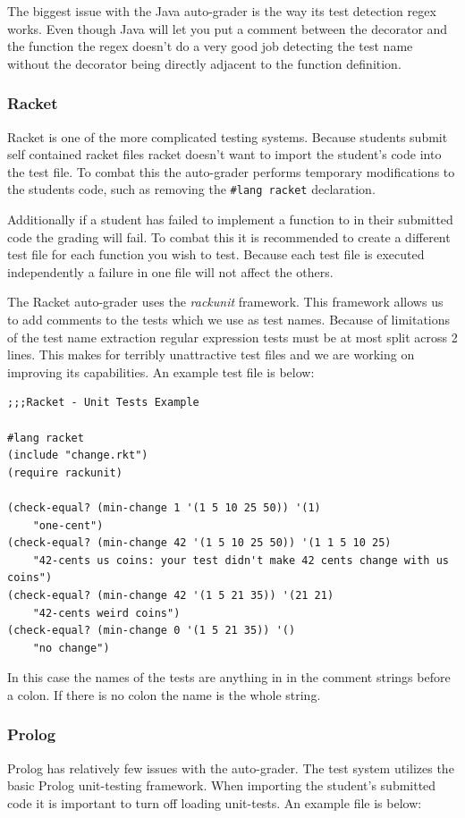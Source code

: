 \documentclass[11pt]{report}
\begin{document}
The biggest issue with the Java auto-grader is the way its test detection regex works. Even though
Java will let you put a comment between the decorator and the function the regex doesn't do a very
good job detecting the test name without the decorator being directly adjacent to the function 
definition.

\pagebreak
\subsubsection{Racket}
Racket is one of the more complicated testing systems. Because students submit self contained racket 
files racket doesn't want to import the student's code into the test file. To combat this the auto-grader 
performs temporary modifications to the students code, such as removing the \texttt{\#lang racket}
declaration. 

Additionally if a student has failed to implement a function to in their submitted code the grading will
fail. To combat this it is recommended to create a different test file for each function you wish to
test. Because each test file is executed independently a failure in one file will not affect the others.

The Racket auto-grader uses the \emph{rackunit} framework. This framework allows us to add comments to
the tests which we use as test names. Because of limitations of the test name extraction regular expression
tests must be at most split across 2 lines. This makes for terribly unattractive test files and we are working
on improving its capabilities. An example test file is below:

\begin{verbatim}
;;;Racket - Unit Tests Example

#lang racket
(include "change.rkt")
(require rackunit)

(check-equal? (min-change 1 '(1 5 10 25 50)) '(1)
	"one-cent")
(check-equal? (min-change 42 '(1 5 10 25 50)) '(1 1 5 10 25)
	"42-cents us coins: your test didn't make 42 cents change with us coins")
(check-equal? (min-change 42 '(1 5 21 35)) '(21 21)
	"42-cents weird coins")
(check-equal? (min-change 0 '(1 5 21 35)) '()
	"no change")
\end{verbatim}

In this case the names of the tests are anything in in the comment strings before a colon. If there is no
colon the name is the whole string. 

\pagebreak
\subsubsection{Prolog}
Prolog has relatively few issues with the auto-grader. The test system utilizes the basic Prolog
unit-testing framework. When importing the student's submitted code it is important to turn off 
loading unit-tests. An example file is below:
\end{document}
